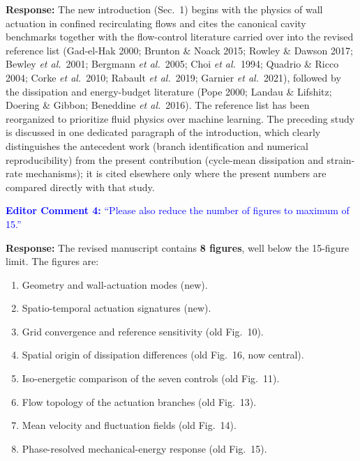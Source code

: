 \documentclass[11pt,a4paper]{article}
\begin{document}
\noindent\textbf{Response:} The new introduction (Sec.~1) begins with the
physics of wall actuation in confined recirculating flows and cites the
canonical cavity benchmarks \cite{ghia1982high,botella1998benchmark,
shankardeshpande2000,albensoeder2005accurate,kuhlmann2019} together with the
flow-control literature carried over into the revised reference list
(Gad-el-Hak 2000; Brunton \& Noack 2015; Rowley \& Dawson 2017; Bewley
\emph{et al.}\ 2001; Bergmann \emph{et al.}\ 2005; Choi \emph{et al.}\ 1994;
Quadrio \& Ricco 2004; Corke \emph{et al.}\ 2010; Rabault \emph{et al.}\ 2019;
Garnier \emph{et al.}\ 2021), followed by the dissipation and energy-budget
literature (Pope 2000; Landau \& Lifshitz; Doering \& Gibbon; Beneddine
\emph{et al.}\ 2016). The reference list has been
reorganized to prioritize fluid physics over machine learning. The preceding
study \cite{Beniaiche2026} is discussed in one dedicated paragraph of the
introduction, which clearly distinguishes the antecedent work (branch
identification and numerical reproducibility) from the present contribution
(cycle-mean dissipation and strain-rate mechanisms); it is cited elsewhere only
where the present numbers are compared directly with that study.

\vspace{1em}

\noindent\textcolor{blue}{\textbf{Editor Comment 4:} ``Please also reduce the
number of figures to maximum of 15.''}

\vspace{0.5em}

\noindent\textbf{Response:} The revised manuscript contains \textbf{8 figures},
well below the 15-figure limit. The figures are:
\begin{enumerate}
\item Geometry and wall-actuation modes (new).
\item Spatio-temporal actuation signatures (new).
\item Grid convergence and reference sensitivity (old Fig.~10).
\item Spatial origin of dissipation differences (old Fig.~16, now central).
\item Iso-energetic comparison of the seven controls (old Fig.~11).
\item Flow topology of the actuation branches (old Fig.~13).
\item Mean velocity and fluctuation fields (old Fig.~14).
\item Phase-resolved mechanical-energy response (old Fig.~15).
\end{enumerate}
\end{document}
